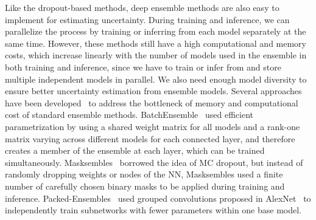     Like the dropout-based methods, deep ensemble methods are also easy to implement for estimating uncertainty. During training and inference, we can parallelize the process by training or inferring from each model separately at the same time. However, these methods still have a high computational and memory costs, which increase linearly with the number of models used in the ensemble in both training and inference, since we have to train or infer from and store multiple independent models in parallel. We also need enough model diversity to ensure better uncertainty estimation from ensemble models. Several approaches have been developed~\cite{BatchEnsemble, Masksembles, PackedEnsemble} to address the bottleneck of memory and computational cost of standard ensemble methods. BatchEnsemble~\cite{BatchEnsemble} used efficient parametrization by using a shared weight matrix for all models and a rank-one matrix varying across different models for each connected layer, and therefore creates a member of the ensemble at each layer, which can be trained simultaneously. Masksembles~\cite{Masksembles} borrowed the idea of MC dropout, but instead of randomly dropping weights or nodes of the NN, Masksembles used a finite number of carefully chosen binary masks to be applied during training and inference. Packed-Ensembles~\cite{PackedEnsemble} used grouped convolutions proposed in AlexNet~\cite{AlexNet} to independently train subnetworks with fewer parameters within one base model.


